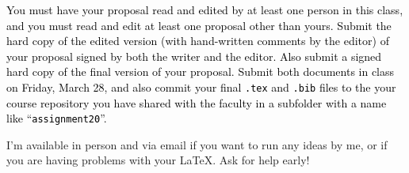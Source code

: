 \textcolor{black}{You must have your proposal read and edited by at least one person in this class, and you must read
  and edit at least one proposal other than yours.  Submit the hard copy of the edited version (with hand-written
  comments by the editor) of your proposal signed by both the writer and the editor.  Also submit a signed hard copy of
  the final version of your proposal.  Submit both documents in class on Friday, March 28, and also commit your final
{\tt .tex} and {\tt .bib} files to the your course repository you have shared with the faculty in a subfolder with a
name like ``{\tt assignment20}''.}

I'm available in person and via email if you want to run any ideas by me, or if you are having problems with your
\LaTeX. Ask for help early!


